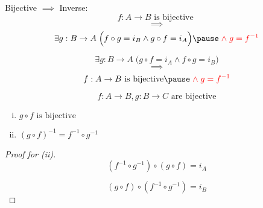 \begin{frame}{}
  \begin{alertblock}{Bijective $\implies$ Inverse:}
    \[
      f: A \to B \text{ is bijective }
    \]
    \[ 
      \implies 
    \]
    \[
      \exists g: B \to A\; \Big( f \circ g = i_B \land g \circ f = i_A \Big) \pause \red{\;\land\; g = f^{-1}}
    \]
  \end{alertblock}

  \pause
  \vspace{0.50cm}
  \begin{theorem}
    \[
      \exists g: B \to A\; \Big( g \circ f = i_A \land f \circ g = i_B \Big) 
    \]
    \[ 
      \implies 
    \]
    \[
      f: A \to B \text{ is bijective} \pause \red{\;\land\; g = f^{-1}}
    \]
  \end{theorem}
\end{frame}

\begin{frame}{}
  \begin{theorem}
    \[
      f: A \to B, g: B \to C \text{ are bijective}
    \]

    \begin{enumerate}[(i)]
      \item $g \circ f \text{ is bijective}$
      \item $(g \circ f)^{-1} = f^{-1} \circ g^{-1}$
    \end{enumerate}
  \end{theorem}

  \begin{proof}[Proof for (ii)]
    \[
      (f^{-1} \circ g^{-1}) \circ (g \circ f) = i_A
    \]

    \[
      (g \circ f) \circ (f^{-1} \circ g^{-1}) = i_B
    \]
  \end{proof}
\end{frame}

% 
% 
% 
